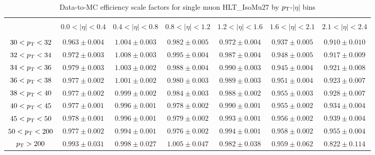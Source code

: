 \begin{table}[!ht]
\centering
\begin{tabular}{|c|c|c|c|c|c|c|}
\hline
  &                                &                                &                                &                                 &                                &                             \\   
  & $0.0 < |\eta| < 0.4$ & $0.4 < |\eta| < 0.8$ & $0.8 < |\eta| < 1.2$ & $1.2 < |\eta| < 1.6$ & $1.6 < |\eta| < 2.1$ & $2.1 < |\eta| < 2.4$ \\
  &                                &                                &                                &                                 &                                &                             \\   

\hline
	$30 < p_\mathrm{T} <   32$ &  $0.963 \pm  0.004$  & $ 1.004 \pm  0.003 $ &  $0.982 \pm  0.005 $ &  $0.972 \pm  0.004$  &  $0.937 \pm  0.005 $ &  $0.910 \pm  0.010$ \\
\hline	
  	$32 < p_\mathrm{T} <   34$ &  $0.972 \pm  0.003$  & $ 1.008 \pm  0.003$  &  $0.995 \pm  0.004 $ &  $0.987 \pm  0.004 $ & $ 0.948 \pm  0.005$  & $ 0.917 \pm  0.009$ \\
\hline  	
	$34 < p_\mathrm{T} <   36 $&  $0.979 \pm  0.003$  &  $1.003 \pm  0.002$  &  $0.988 \pm  0.004 $ &  $0.990 \pm  0.003$  &  $0.945 \pm  0.004 $ & $ 0.921 \pm  0.008 $\\
\hline  	
	$36 < p_\mathrm{T} <   38$ &  $0.977 \pm  0.002$  &  $1.001 \pm  0.002$  &  $0.980 \pm  0.003 $ &  $0.989 \pm  0.003$  & $ 0.951 \pm  0.004 $ & $ 0.923 \pm  0.007$ \\
\hline  	
	$38 < p_\mathrm{T} <   40$ &  $0.977 \pm  0.002$  &  $0.999 \pm  0.002$  &  $0.984 \pm  0.003$  &  $0.988 \pm  0.002$  & $ 0.955 \pm  0.003$  & $ 0.928 \pm  0.007$ \\
\hline  	
	$40 < p_\mathrm{T} <   45$ &  $0.977 \pm  0.001$  &  $0.996 \pm  0.001$  &  $0.978 \pm  0.002$  &  $0.990 \pm  0.001$  &  $0.955 \pm  0.002 $ &  $0.934 \pm  0.004 $\\
\hline  	
	$45 < p_\mathrm{T} <   50$ &  $0.978 \pm  0.001$  & $ 0.996 \pm  0.001$  &  $0.979 \pm  0.002$  &  $0.993 \pm  0.001$  &  $0.956 \pm  0.002 $ & $ 0.939 \pm  0.004$ \\
\hline  	

	$50 < p_\mathrm{T} <  200$ &  $0.977 \pm  0.002$  &  $0.994 \pm  0.001$  &  $0.976 \pm  0.002$  &  $0.994 \pm  0.001$  &  $0.958 \pm  0.002$  &  $0.955 \pm  0.004$ \\

\hline      	
	 $p_\mathrm{T} >  200$ &  $0.993 \pm  0.031$  &  $0.998 \pm  0.027$  &  $1.005 \pm  0.047$  &  $0.982 \pm  0.038$  &  $0.959 \pm  0.062 $ &  $0.822 \pm  0.114 $\\
\hline
\end{tabular}
\caption{Data-to-MC efficiency scale factors for single muon HLT\_IsoMu27 by $p_\mathrm{T}$-$|\eta|$ bins}
\label{tab:sf_mu}
\end{table}


